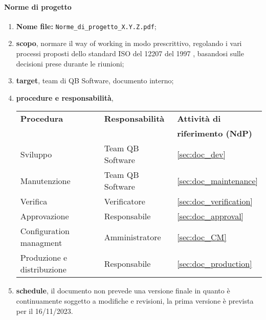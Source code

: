         \paragraph{Norme di progetto}
            \begin{enumerate}
                \item \textbf{Nome file:} \texttt{Norme\_di\_progetto\_X.Y.Z.pdf};
                \item \textbf{scopo}, normare il way of working in modo prescrittivo, regolando i vari processi proposti dello standard ISO del 12207 del 1997 \cite{bib:ISO12207_1997}, basandosi sulle decisioni prese durante le riunioni;
                \item \textbf{target}, team di QB Software, documento interno;
                \item \textbf{procedure e responsabilità},
                \\
                \begin{tabularx}{0.93\textwidth}{|X|X|X|}
                    \hline
                    \textbf{Procedura} & \textbf{Responsabilità} & \textbf{Attività di} \\
                    & & \textbf{riferimento (NdP)} \\
                    \hline
                    Sviluppo & Team QB Software &  \ref{sec:doc_dev}
                    \\\hline
                    Manutenzione & Team QB Software & \ref{sec:doc_maintenance} 
                    \\\hline
                    Verifica & Verificatore & \ref{sec:doc_verification}
                    \\\hline
                    Approvazione & Responsabile & \ref{sec:doc_approval}
                    \\\hline
                    Configuration managment & Amministratore & \ref{sec:doc_CM}
                    \\\hline
                    Produzione e distribuzione & Responsabile & \ref{sec:doc_production}
                    \\\hline
                \end{tabularx}
                \item \textbf{schedule}, il documento non prevede una versione finale in quanto è continuamente soggetto a modifiche e revisioni, la prima versione è prevista per il 16/11/2023. 
            \end{enumerate} 

